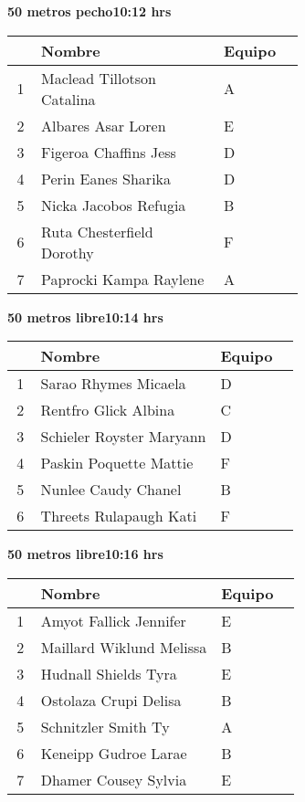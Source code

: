 \begin{minipage}{0.95\linewidth}
\begin{center}
\textbf{
50 metros pecho\hspace{1cm}10:12 hrs}
\end{center}
\begin{tabular}{cp{0.63\linewidth}l}
\hline
& \textbf{Nombre} & \textbf{Equipo} \\ \hline
1 & Maclead Tillotson Catalina & A \\ 
2 & Albares Asar Loren & E \\ 
3 & Figeroa Chaffins Jess & D \\ 
4 & Perin Eanes Sharika & D \\ 
5 & Nicka Jacobos Refugia & B \\ 
6 & Ruta Chesterfield Dorothy & F \\ 
7 & Paprocki Kampa Raylene & A \\ 
\end{tabular}
\end{minipage}
\begin{minipage}{0.95\linewidth}
\begin{center}
\textbf{
50 metros libre\hspace{1cm}10:14 hrs}
\end{center}
\begin{tabular}{cp{0.63\linewidth}l}
\hline
& \textbf{Nombre} & \textbf{Equipo} \\ \hline
1 & Sarao Rhymes Micaela & D \\ 
2 & Rentfro Glick Albina & C \\ 
3 & Schieler Royster Maryann & D \\ 
4 & Paskin Poquette Mattie & F \\ 
5 & Nunlee Caudy Chanel & B \\ 
6 & Threets Rulapaugh Kati & F \\ 
\end{tabular}
\end{minipage}
\begin{minipage}{0.95\linewidth}
\begin{center}
\textbf{
50 metros libre\hspace{1cm}10:16 hrs}
\end{center}
\begin{tabular}{cp{0.63\linewidth}l}
\hline
& \textbf{Nombre} & \textbf{Equipo} \\ \hline
1 & Amyot Fallick Jennifer & E \\ 
2 & Maillard Wiklund Melissa & B \\ 
3 & Hudnall Shields Tyra & E \\ 
4 & Ostolaza Crupi Delisa & B \\ 
5 & Schnitzler Smith Ty & A \\ 
6 & Keneipp Gudroe Larae & B \\ 
7 & Dhamer Cousey Sylvia & E \\ 
\end{tabular}
\end{minipage}
